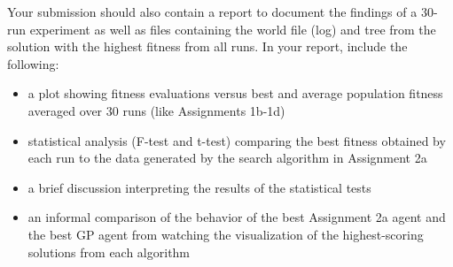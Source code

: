 \documentclass{article}
\begin{document}
Your submission should also contain a report to document the findings of a 30-run experiment as well as files containing the world file (log) and tree from the solution with the highest fitness from all runs. In your report, include the following:
\begin{itemize}
    \item a plot showing fitness evaluations versus best and average population fitness averaged over 30 runs (like Assignments 1b-1d)
    \item statistical analysis (F-test and t-test) comparing the best fitness obtained by each run to the data generated by the search algorithm in Assignment 2a
    \item a brief discussion interpreting the results of the statistical tests
    \item an informal comparison of the behavior of the best Assignment 2a agent and the best GP agent from watching the visualization of the highest-scoring solutions from each algorithm
\end{itemize}
\end{document}
